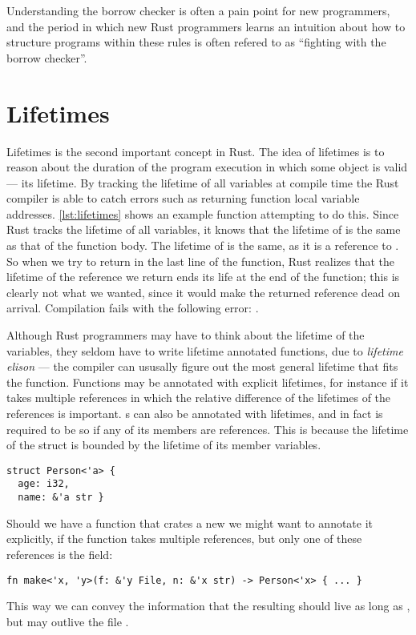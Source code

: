 

Understanding the borrow checker is often a pain point for new programmers, and the period in which
new Rust programmers learns an intuition about how to structure programs within these rules is
often refered to as ``fighting with the borrow checker''.


\section{Lifetimes\label{sec:rust-lifetimes}}

Lifetimes is the second important concept in Rust. The idea of lifetimes is to reason about the
duration of the program execution in which some object is valid --- its lifetime. By tracking the
lifetime of all variables at compile time the Rust compiler is able to catch errors such as
returning function local variable addresses. \cref{lst:lifetimes} shows an example function
attempting to do this.   Since Rust tracks the lifetime of all variables,
it knows that the lifetime of  is the same as that of the function body. The lifetime of
 is the same, as it is a reference to . So when we try to return  in the
last line of the function, Rust realizes that the lifetime of the reference we return ends its life
at the end of the function; this is clearly not what we wanted, since it would make the returned
reference dead on arrival. Compilation fails with the following error: .


Although Rust programmers may have to think about the lifetime of the variables, they seldom have
to write lifetime annotated functions, due to \emph{lifetime elison} --- the compiler can ususally
figure out the most general lifetime that fits the function. Functions may be annotated with
explicit lifetimes, for instance if it takes multiple references in which the relative difference
of the lifetimes of the references is important.
s can also be annotated with lifetimes, and in fact is required to be so if any of its
members are references. This is because the lifetime of the struct is bounded by the lifetime of
its member variables.
\begin{lstlisting}
struct Person<'a> {
  age: i32,
  name: &'a str }
\end{lstlisting}
Should we have a function that crates a new  we might want to annotate it explicitly,
if the function takes multiple references, but only one of these references is the 
field:
\begin{lstlisting}
fn make<'x, 'y>(f: &'y File, n: &'x str) -> Person<'x> { ... }
\end{lstlisting}
This way we can convey the information that the resulting  should live as long as
, but may outlive the file .



